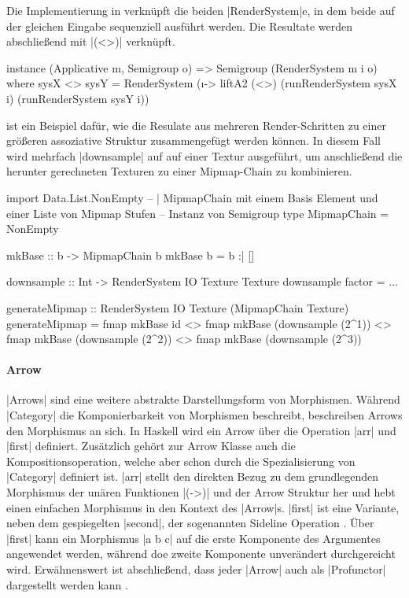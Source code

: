 Die Implementierung in  verknüpft die beiden |RenderSystem|e, in dem beide auf der gleichen Eingabe sequenziell ausführt werden. Die Resultate werden abschließend mit |(<>)| verknüpft.

\begin{haskell}[label={lst:rendersystem-semigroup},caption={Semigroup Instanz für RenderSystem}]
instance (Applicative m, Semigroup o) => Semigroup (RenderSystem m i o) where
	sysX <> sysY =  RenderSystem (\i -> liftA2 (<>) (runRenderSystem sysX i) (runRenderSystem sysY i))
\end{haskell}

 ist ein Beispiel dafür, wie die Resulate aus mehreren Render-Schritten zu einer größeren assoziative Struktur zusammengefügt werden können. In diesem Fall wird mehrfach |downsample| auf auf einer Textur ausgeführt, um anschließend die herunter gerechneten Texturen zu einer Mipmap-Chain zu kombinieren. 

\begin{haskell}[label={lst:rendersystem-semigroup-beispiel},caption={Beispielanwendung Semigroup für RenderSystem}]
import Data.List.NonEmpty
-- | MipmapChain mit einem Basis Element und einer Liste von Mipmap Stufen
-- Instanz von Semigroup
type MipmapChain = NonEmpty

mkBase :: b -> MipmapChain b
mkBase b = b :| []

downsample :: Int -> RenderSystem IO Texture Texture
downsample factor = ...

generateMipmap :: RenderSystem IO Texture (MipmapChain Texture)
generateMipmap = fmap mkBase id 
	<> fmap mkBase (downsample (2^1)) 
	<> fmap mkBase (downsample (2^2)) 
	<> fmap mkBase (downsample (2^3))
\end{haskell}



\paragraph{Arrow}

|Arrows| sind eine weitere abstrakte Darstellungsform von Morphismen. Während |Category| die Komponierbarkeit von Morphismen beschreibt, beschreiben Arrows den Morphismus an sich. In Haskell wird ein Arrow über die Operation |arr| und |first| definiert. Zusätzlich gehört zur Arrow Klasse auch die Kompositionsoperation, welche aber schon durch die Spezialisierung von |Category| definiert ist. |arr| stellt den direkten Bezug zu dem grundlegenden Morphismus der unären Funktionen |(->)| und der Arrow Struktur her und hebt einen einfachen Morphismus in den Kontext des |Arrow|s. |first| ist eine Variante, neben dem gespiegelten |second|, der sogenannten Sideline Operation \parencite[Kapitel 1]{Asada2010}. Über |first| kann ein Morphismus |a b c| auf die erste Komponente des Argumentes angewendet werden, während doe zweite Komponente unverändert durchgereicht wird. Erwähnenswert ist abschließend, dass jeder |Arrow| auch als |Profunctor| dargestellt werden kann \parencite[Kapitel 3]{Asada2010}.

